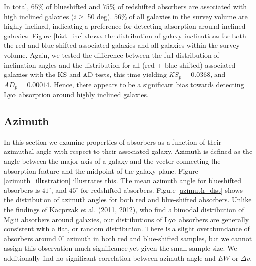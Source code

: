 \documentclass[iop]{emulateapj-rtx4}
\begin{document}

In total, $65\%$ of blueshifted and $75\%$ of redshifted absorbers are associated with high inclined galaxies ($i \geq$ 50 deg). $56\%$ of all galaxies in the survey volume are highly inclined, indicating a preference for detecting absorption around inclined galaxies. Figure \ref{hist_inc} shows the distribution of galaxy inclinations for both the red and blue-shifted associated galaxies and all galaxies within the survey volume. Again, we tested the difference between the full distribution of inclination angles and the distribution for all (red + blue-shifted) associated galaxies with the KS and AD tests, this time yielding $KS_{p} =0.0368$, and $AD_{p} = 0.00014$. Hence, there appears to be a significant bias towards detecting Ly$\alpha$ absorption around highly inclined galaxies. 


\subsection{Azimuth}
In this section we examine properties of absorbers as a function of their azimuthal angle with respect to their associated galaxy. Azimuth is defined as the angle between the major axis of a galaxy and the vector connecting the absorption feature and the midpoint of the galaxy plane. Figure \ref{azimuth_illustration} illustrates this. The mean azimuth angle for blueshifted absorbers is $41^{\circ}$, and $45^{\circ}$ for redshifted absorbers. Figure \ref{azimuth_dist} shows the distribution of azimuth angles for both red and blue-shifted absorbers. Unlike the findings of Kacprzak et al. (2011, 2012), who find a bimodal distribution of Mg\,{\sc ii} absorbers around galaxies, our distributions of Ly$\alpha$ absorbers are generally consistent with a flat, or random distribution. There is a slight overabundance of absorbers around $0^{\circ}$ azimuth in both red and blue-shifted samples, but we cannot assign this observation much significance yet given the small sample size. We additionally find no significant correlation between azimuth angle and $EW$ or $\Delta v$. 

\end{document}
